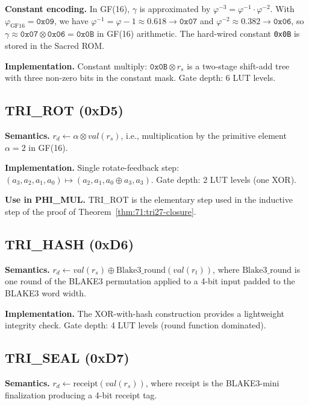 \textbf{Constant encoding.} In GF(16), $\gamma$ is approximated by
$\varphi^{-3} = \varphi^{-1} \cdot \varphi^{-2}$.
With $\varphi_{\mathrm{GF16}} = \texttt{0x09}$, we have
$\varphi^{-1} = \varphi - 1 \approx 0.618 \to \texttt{0x07}$ and
$\varphi^{-2} \approx 0.382 \to \texttt{0x06}$, so
$\gamma \approx \texttt{0x07} \otimes \texttt{0x06} = \texttt{0x0B}$
in GF(16) arithmetic.  The hard-wired constant \texttt{0x0B} is stored
in the Sacred ROM.

\textbf{Implementation.} Constant multiply: $\texttt{0x0B} \otimes r_s$
is a two-stage shift-add tree with three non-zero bits in the constant
mask.  Gate depth: 6 LUT levels.

\subsection{TRI\_ROT (0xD5)}
\label{subsec:71:tri-rot}

\textbf{Semantics.} $r_d \leftarrow \alpha \otimes \mathit{val}(r_s)$,
i.e., multiplication by the primitive element $\alpha = 2$ in GF(16).

\textbf{Implementation.} Single rotate-feedback step:
$(a_3, a_2, a_1, a_0) \mapsto (a_2, a_1, a_0 \oplus a_3, a_3)$.
Gate depth: 2 LUT levels (one XOR).

\textbf{Use in PHI\_MUL.} TRI\_ROT is the elementary step used in
the inductive step of the proof of Theorem~\ref{thm:71:tri27-closure}.

\subsection{TRI\_HASH (0xD6)}
\label{subsec:71:tri-hash}

\textbf{Semantics.} $r_d \leftarrow \mathit{val}(r_s) \oplus
\mathrm{Blake3\_round}(\mathit{val}(r_t))$, where
$\mathrm{Blake3\_round}$ is one round of the BLAKE3 permutation
applied to a 4-bit input padded to the BLAKE3 word width.

\textbf{Implementation.} The XOR-with-hash construction provides a
lightweight integrity check.  Gate depth: 4 LUT levels (round
function dominated).

\subsection{TRI\_SEAL (0xD7)}
\label{subsec:71:tri-seal}

\textbf{Semantics.} $r_d \leftarrow \mathrm{receipt}(\mathit{val}(r_s))$,
where $\mathrm{receipt}$ is the BLAKE3-mini finalization producing a
4-bit receipt tag.

